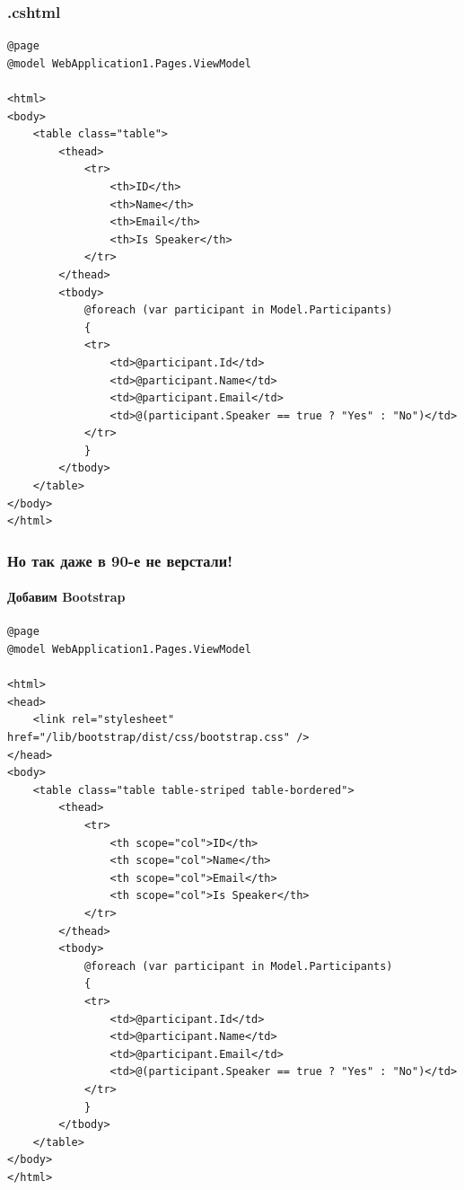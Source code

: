 \documentclass[xetex,mathserif,serif]{beamer}
\begin{document}
	\begin{frame}[fragile]
		\frametitle{.cshtml}
		\begin{ssmall}
			\begin{verbatim}
@page
@model WebApplication1.Pages.ViewModel

<html>
<body>
    <table class="table">
        <thead>
            <tr>
                <th>ID</th>
                <th>Name</th>
                <th>Email</th>
                <th>Is Speaker</th>
            </tr>
        </thead>
        <tbody>
            @foreach (var participant in Model.Participants)
            {
            <tr>
                <td>@participant.Id</td>
                <td>@participant.Name</td>
                <td>@participant.Email</td>
                <td>@(participant.Speaker == true ? "Yes" : "No")</td>
            </tr>
            }
        </tbody>
    </table>
</body>
</html>
			\end{verbatim}
		\end{ssmall}
	\end{frame}

	\begin{frame}[fragile]
		\frametitle{Но так даже в 90-е не верстали!}
		\framesubtitle{Добавим Bootstrap}
		\begin{tiny}
			\begin{verbatim}
@page
@model WebApplication1.Pages.ViewModel

<html>
<head>
    <link rel="stylesheet" href="/lib/bootstrap/dist/css/bootstrap.css" />
</head>
<body>
    <table class="table table-striped table-bordered">
        <thead>
            <tr>
                <th scope="col">ID</th>
                <th scope="col">Name</th>
                <th scope="col">Email</th>
                <th scope="col">Is Speaker</th>
            </tr>
        </thead>
        <tbody>
            @foreach (var participant in Model.Participants)
            {
            <tr>
                <td>@participant.Id</td>
                <td>@participant.Name</td>
                <td>@participant.Email</td>
                <td>@(participant.Speaker == true ? "Yes" : "No")</td>
            </tr>
            }
        </tbody>
    </table>
</body>
</html>
			\end{verbatim}
		\end{tiny}
	\end{frame}
\end{document}
